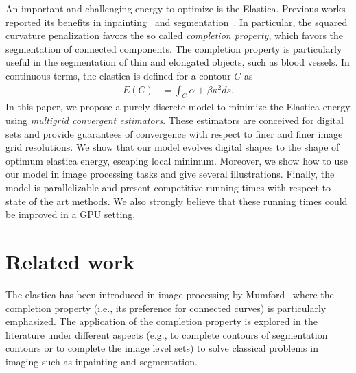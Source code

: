 \documentclass[smallextended]{svjour3}
\begin{document}
An important and challenging energy to optimize is the Elastica. Previous works reported its benefits in inpainting~\cite{masnou98inpainting,ballester01filljoint,chan02elasticainpainting} and segmentation~\cite{goldluecke11totalcurvature,zhu2013image,nieuwenhuis14efficient, antunes20}. In particular, the squared curvature penalization favors the so called \emph{completion property}, which favors the segmentation of connected components. The completion property is particularly useful in the segmentation of thin and elongated objects, such as blood vessels. In continuous terms, the elastica is defined for a contour $C$ as
%
\begin{align*}
	E(C) &= \int_{C}{\alpha + \beta \kappa^2 ds}.
\end{align*}
%
In this paper, we propose a purely discrete model to minimize the Elastica energy using \emph{multigrid convergent estimators}. These estimators are conceived for digital sets and provide guarantees of convergence with respect to finer and finer image grid resolutions. We show that our model evolves digital shapes to the shape of optimum elastica energy, escaping local minimum. Moreover, we show how to use our model in image processing tasks and give several illustrations. Finally, the model is parallelizable and present competitive running times with respect to state of the art methods. We also strongly believe that these running times could be improved in a GPU setting.
%
%

\section{Related work}

The elastica has been introduced in image processing by Mumford~\cite{mumford1994elastica} 
where the completion property (i.e., its preference for connected curves) is 
particularly emphasized. The application of the completion property is explored 
in the literature under different aspects (e.g., to complete contours of 
segmentation contours or to complete the image level sets) to solve classical 
problems in imaging such as inpainting and segmentation. 
\end{document}
